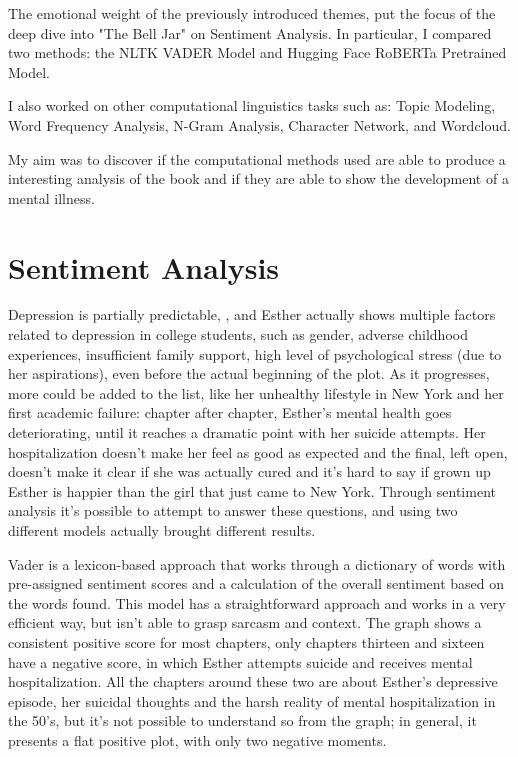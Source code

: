 \documentclass[11pt]{article}
\begin{document}
The emotional weight of the previously introduced themes, put the focus of the deep dive into "The Bell Jar" on Sentiment Analysis. In particular, I compared two methods: the NLTK VADER Model and Hugging Face RoBERTa Pretrained Model. 

I also worked on other computational linguistics tasks such as: Topic Modeling, Word Frequency Analysis, N-Gram Analysis, Character Network, and Wordcloud. 

My aim was to discover if the computational methods used are able to produce a interesting analysis of the book and if they are able to show the development of a mental illness.

 

\section{Sentiment Analysis}
Depression is partially predictable,  \cite{Thompson:24}, and Esther actually shows multiple factors related to depression in college students, such as gender, adverse childhood experiences, insufficient family support, high level of psychological stress (due to her aspirations), even before the actual beginning of the plot. As it progresses, more could be added to the list, like her unhealthy lifestyle in New York and her first academic failure: chapter after chapter, Esther’s mental health goes deteriorating, until it reaches a dramatic point with her suicide attempts. Her hospitalization doesn’t make her feel as good as expected and the final, left open, doesn’t make it clear if she was actually cured and it’s hard to say if grown up Esther is happier than the girl that just came to New York.
Through sentiment analysis it’s possible to attempt to answer these questions, and using two different models actually brought different results. 

Vader is a lexicon-based approach that works through a dictionary of words with pre-assigned sentiment scores and a calculation of the overall sentiment based on the words found. This model has a straightforward approach and works in a very efficient way, but isn’t able to grasp sarcasm and context. The graph shows a consistent positive score for most chapters, only chapters thirteen and sixteen have a negative score, in which Esther attempts suicide and receives mental hospitalization. All the chapters around these two are about Esther’s depressive episode, her suicidal thoughts and the harsh reality of mental hospitalization in the 50’s, but it’s not possible to understand so from the graph; in general, it presents a flat positive plot, with only two negative moments.
\end{document}
